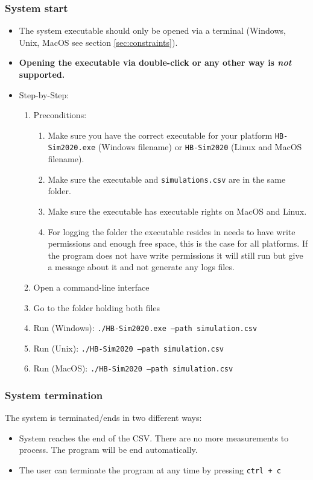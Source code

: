 \documentclass[a4paper]{article}
\begin{document}
\subsubsection*{System start}
\begin{itemize}
    \item The system executable should only be opened via a terminal (Windows, Unix, MacOS see section \ref{sec:constraints}).
    \item \textbf{Opening the executable via double-click or any other way is \textit{not} supported.}
\item Step-by-Step: \begin{enumerate}
    \item Preconditions:
        \begin{enumerate}
            \item Make sure you have the correct executable for your platform \texttt{HB-Sim2020.exe} (Windows filename) or \texttt{HB-Sim2020} (Linux and MacOS filename).
            \item Make sure the executable and \texttt{simulations.csv} are in the same folder.
            \item Make sure the executable has executable rights on MacOS and Linux.
            \item For logging the folder the executable resides in needs to have write permissions and enough free space, this is the case for all platforms. If the program does not have write permissions it will still run but give a message about it and not generate any logs files.
        \end{enumerate}
    \item Open a command-line interface
    \item Go to the folder holding both files
    \item Run (Windows): \texttt{./HB-Sim2020.exe --path simulation.csv}
    \item Run (Unix): \texttt{./HB-Sim2020 --path simulation.csv}
    \item Run (MacOS): \texttt{./HB-Sim2020 --path simulation.csv}
\end{enumerate}
\end{itemize}

\subsubsection*{System termination}
The system is terminated/ends in two different ways:
\begin{itemize}
    \item System reaches the end of the CSV. There are no more measurements to process. The program will be end automatically.
    \item The user can terminate the program at any time by pressing \texttt{ctrl + c}
\end{itemize}
\end{document}
